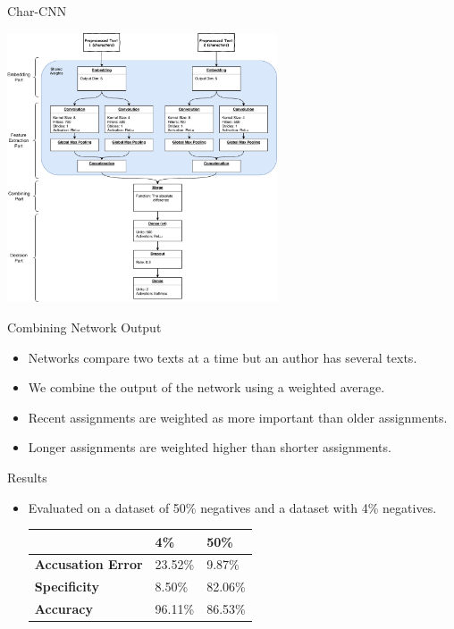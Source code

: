 \documentclass[10pt]{beamer}
\begin{document}
\begin{frame}[fragile]{Char-CNN}
    \begin{center}
        \includegraphics[width=0.6\textwidth]{../../macom/summary/pictures/model}
    \end{center}
\end{frame}

\begin{frame}[fragile]{Combining Network Output}
    \begin{itemize}
        \item Networks compare two texts at a time but an author has several
            texts.
        \item We combine the output of the network using a weighted average.
        \item Recent assignments are weighted as more important than older
            assignments.
        \item Longer assignments are weighted higher than shorter assignments.
    \end{itemize}
\end{frame}

\begin{frame}[fragile]{Results}
    \begin{itemize}
        \item Evaluated on a dataset of 50\% negatives and a dataset with 4\%
            negatives.

            \begin{center}
                \begin{tabular}{l|ll}
                                              & \textbf{4\%} & \textbf{50\%} \\
                    \hline
                    \textbf{Accusation Error} & 23.52\%      & 9.87\%        \\
                    \textbf{Specificity}      & 8.50\%       & 82.06\%       \\
                    \textbf{Accuracy}         & 96.11\%      & 86.53\%       \\
                \end{tabular}
            \end{center}
    \end{itemize}
\end{frame}
\end{document}
